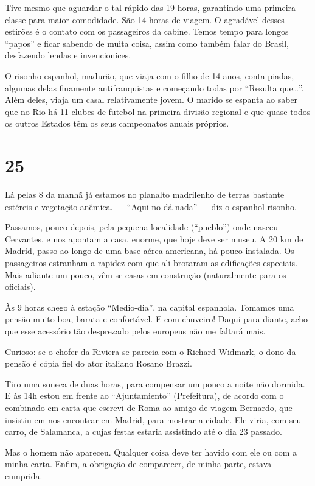 Tive mesmo que aguardar o tal rápido das 19 horas, garantindo uma primeira classe para maior comodidade. São 14 horas de viagem. O agradável desses estirões é o contato com os passageiros da cabine. Temos tempo para longos ``papos'' e ficar sabendo de muita coisa, assim como também falar do Brasil, desfazendo lendas e invencionices.

O risonho espanhol, madurão, que viaja com o filho de 14 anos, conta piadas, algumas delas finamente antifranquistas e começando todas por ``Resulta que\ldots''. Além deles, viaja um casal relativamente jovem. O marido se espanta ao saber que no Rio há 11 clubes de futebol na primeira divisão regional e que quase todos os outros Estados têm os seus campeonatos anuais próprios.

\section*{25 \adfflatleafright {}}
Lá pelas 8 da manhã já estamos no planalto madrilenho de terras bastante estéreis e vegetação anêmica. --- ``Aqui no dá nada'' --- diz o espanhol risonho.

Passamos, pouco depois, pela pequena localidade (``pueblo'') onde nasceu Cervantes, e nos apontam a casa, enorme, que hoje deve ser museu. A 20 km de Madrid, passo ao longo de uma base aérea americana, há pouco instalada. Os passageiros estranham a rapidez com que ali brotaram as edificações especiais. Mais adiante um pouco, vêm-se casas em construção (naturalmente para os oficiais).

Às 9 horas chego à estação ``Medio-dia'', na capital espanhola. Tomamos uma pensão muito boa, barata e confortável. E com chuveiro! Daqui para diante, acho que esse acessório tão desprezado pelos europeus não me faltará mais.

Curioso: se o chofer da Riviera se parecia com o Richard Widmark, o dono da pensão é cópia fiel do ator italiano Rosano Brazzi.

Tiro uma soneca de duas horas, para compensar um pouco a noite não dormida. E às 14h estou em frente ao ``Ajuntamiento'' (Prefeitura), de acordo com o combinado em carta que escrevi de Roma ao amigo de viagem Bernardo, que insistiu em nos encontrar em Madrid, para mostrar a cidade. Ele viria, com seu carro, de Salamanca, a cujas festas estaria assistindo até o dia 23 passado.

Mas o homem não apareceu. Qualquer coisa deve ter havido com ele ou com a minha carta. Enfim, a obrigação de comparecer, de minha parte, estava cumprida.

